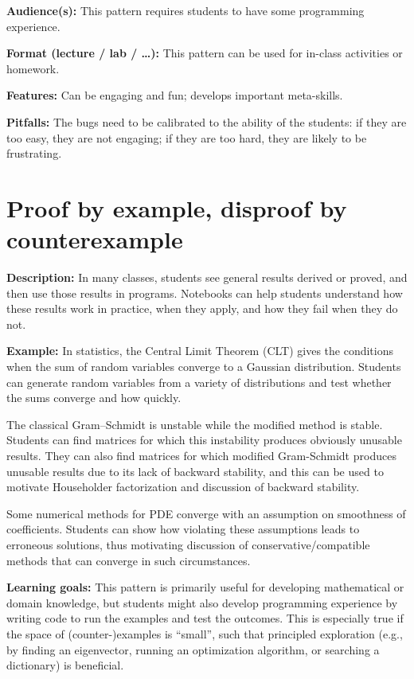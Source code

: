 \documentclass[]{book}
\begin{document}
\textbf{Audience(s):} This pattern requires students to have some
programming experience.

\textbf{Format (lecture / lab / \ldots{}):} This pattern can be used for
in-class activities or homework.

\textbf{Features:} Can be engaging and fun; develops important
meta-skills.

\textbf{Pitfalls:} The bugs need to be calibrated to the ability of the
students: if they are too easy, they are not engaging; if they are too
hard, they are likely to be frustrating.

\section{Proof by example, disproof by
counterexample}\label{proof-by-example-disproof-by-counterexample}

\textbf{Description:} In many classes, students see general results
derived or proved, and then use those results in programs. Notebooks can
help students understand how these results work in practice, when they
apply, and how they fail when they do not.

\textbf{Example:} In statistics, the Central Limit Theorem (CLT) gives
the conditions when the sum of random variables converge to a Gaussian
distribution. Students can generate random variables from a variety of
distributions and test whether the sums converge and how quickly.

The classical Gram--Schmidt is unstable while the modified method is
stable. Students can find matrices for which this instability produces
obviously unusable results. They can also find matrices for which
modified Gram-Schmidt produces unusable results due to its lack of
backward stability, and this can be used to motivate Householder
factorization and discussion of backward stability.

Some numerical methods for PDE converge with an assumption on smoothness
of coefficients. Students can show how violating these assumptions leads
to erroneous solutions, thus motivating discussion of
conservative/compatible methods that can converge in such circumstances.

\textbf{Learning goals:} This pattern is primarily useful for developing
mathematical or domain knowledge, but students might also develop
programming experience by writing code to run the examples and test the
outcomes. This is especially true if the space of (counter-)examples is
``small'', such that principled exploration (e.g., by finding an
eigenvector, running an optimization algorithm, or searching a
dictionary) is beneficial.
\end{document}
